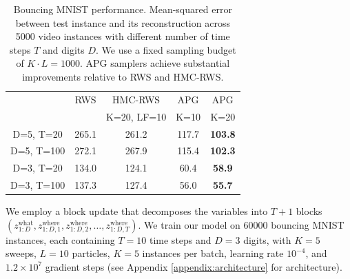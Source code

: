 \documentclass{article}
\theoremstyle{definition}
\begin{document}
\begin{table}[t!]
    \centering
    \caption{Bouncing MNIST performance. Mean-squared error between test instance and its reconstruction across 5000 video instances with different number of time steps $T$ and digits $D$. We use a fixed sampling budget of $K \cdot L=1000$. APG samplers achieve substantial improvements relative to RWS and HMC-RWS.}
    \vspace{0.5em}
    \begin{tabularx}{\columnwidth}{ccccc}
    \toprule
        & RWS & HMC-RWS & APG & APG \\
        &  &  K=20, LF=10 & K=10 & K=20 \\
    \midrule
    D=5, T=20 & 265.1 & 261.2 & 117.7 & \textbf{103.8}\\
    \hspace{0.5em}D=5, T=100 & 272.1 & 267.9  & 115.4 & \textbf{102.3}\\
    D=3, T=20 & 134.0 & 124.1 & 60.4 & \textbf{58.9} \\   
    \hspace{0.5em}D=3, T=100 & 137.3 & 127.4 & 56.0 & \textbf{55.7} \\
    
    \bottomrule
    \end{tabularx}
    \vspace{-1em}
    \label{table:mse-bmnist}
\end{table}

We employ a block update that decomposes the variables into $T + 1$ blocks $(z_{1:D}^{\mathrm{what}}, z_{1:D, 1}^{\mathrm{where}}, z_{1:D, 2}^{\mathrm{where}}, \dotsc, z_{1:D, T}^{\mathrm{where}})$.
We train our model on 60000 bouncing MNIST instances, each containing $T=10$ time steps and $D=3$ digits, with $K=5$ sweeps, $L=10$ particles, $K=5$ instances per batch, learning rate $10^{-4}$, and $1.2\times10^7$ gradient steps (see Appendix \ref{appendix:architecture} for architecture).
\end{document}
